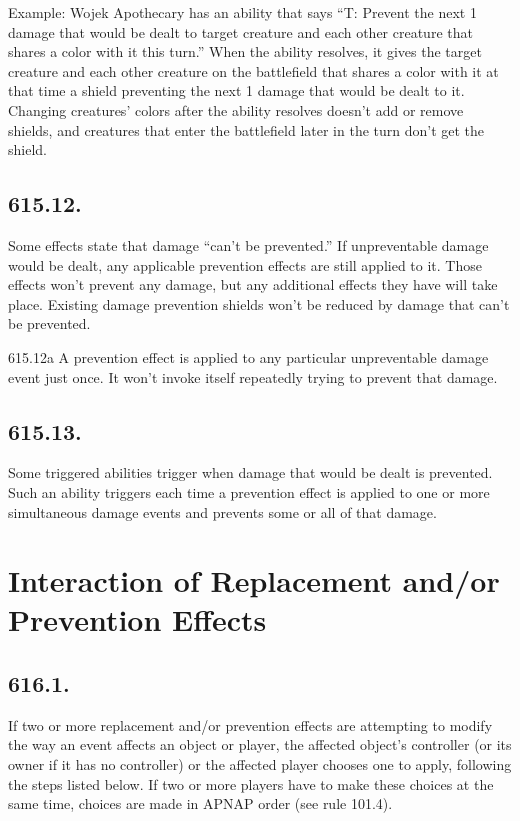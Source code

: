 Example: Wojek Apothecary has an ability that says “{T}: Prevent the next 1 damage that would be dealt to target creature and each other creature that shares a color with it this turn.” When the ability resolves, it gives the target creature and each other creature on the battlefield that shares a color with it at that time a shield preventing the next 1 damage that would be dealt to it. Changing creatures’ colors after the ability resolves doesn’t add or remove shields, and creatures that enter the battlefield later in the turn don’t get the shield.

\subsection*{615.12.}
Some effects state that damage “can’t be prevented.” If unpreventable damage would be dealt, any applicable prevention effects are still applied to it. Those effects won’t prevent any damage, but any additional effects they have will take place. Existing damage prevention shields won’t be reduced by damage that can’t be prevented.

615.12a A prevention effect is applied to any particular unpreventable damage event just once. It won’t invoke itself repeatedly trying to prevent that damage.

\subsection*{615.13.}
Some triggered abilities trigger when damage that would be dealt is prevented. Such an ability triggers each time a prevention effect is applied to one or more simultaneous damage events and prevents some or all of that damage.

\section{Interaction of Replacement and/or Prevention Effects}
\subsection*{616.1.}
If two or more replacement and/or prevention effects are attempting to modify the way an event affects an object or player, the affected object’s controller (or its owner if it has no controller) or the affected player chooses one to apply, following the steps listed below. If two or more players have to make these choices at the same time, choices are made in APNAP order (see rule 101.4).

